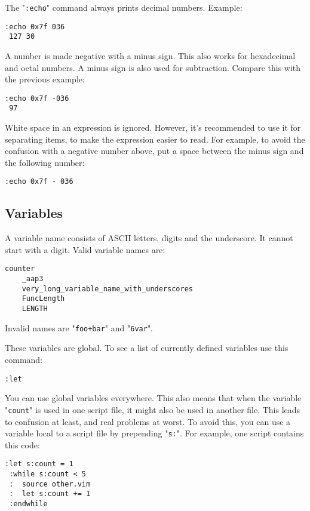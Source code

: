 The "\texttt{:echo}" command always prints decimal numbers.
Example:

\begin{Verbatim}[samepage=true]
 :echo 0x7f 036
 127 30
\end{Verbatim}

A number is made negative with a minus sign.
This also works for hexadecimal and octal numbers.
A minus sign is also used for subtraction.
Compare this with the previous example:

\begin{Verbatim}[samepage=true]
 :echo 0x7f -036
 97
\end{Verbatim}

White space in an expression is ignored.
However, it's recommended to use it for separating items, to make the expression easier to read.
For example, to avoid the confusion with a negative number above, put a space between the minus sign and the following number:

\begin{Verbatim}[samepage=true]
 :echo 0x7f - 036
\end{Verbatim}
\subsection{Variables}
A variable name consists of ASCII letters, digits and the underscore.
It cannot start with a digit.
Valid variable names are:

\begin{Verbatim}[samepage=true]
    counter
    _aap3
    very_long_variable_name_with_underscores
    FuncLength
    LENGTH
\end{Verbatim}

Invalid names are "\texttt{foo+bar}" and "\texttt{6var}".

These variables are global.
To see a list of currently defined variables use this command:

\begin{Verbatim}[samepage=true]
 :let
\end{Verbatim}

You can use global variables everywhere.
This also means that when the variable "\texttt{count}" is used in one script file, it might also be used in another file.
This leads to confusion at least, and real problems at worst.
To avoid this, you can use a variable local to a script file by prepending "\texttt{s:}".
For example, one script contains this code:

\begin{Verbatim}[samepage=true]
 :let s:count = 1
 :while s:count < 5
 :  source other.vim
 :  let s:count += 1
 :endwhile
\end{Verbatim}

